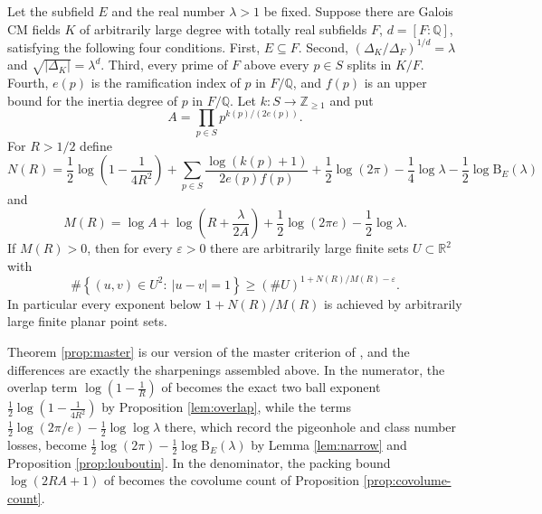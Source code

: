 \begin{theorem}\label{prop:master}
Let the subfield $E$ and the real number $\lambda>1$ be fixed.  Suppose there are Galois CM fields $K$ of arbitrarily large degree with totally real subfields $F$, $d=[F:\mathbb{Q}]$, satisfying the following four conditions.  First, $E\subseteq F$.  Second, $(\Delta_K/\Delta_F)^{1/d}=\lambda$ and $\sqrt{|\Delta_K|}=\lambda^d$.  Third, every prime of $F$ above every $p\in S$ splits in $K/F$.  Fourth, $e(p)$ is the ramification index of $p$ in $F/\mathbb{Q}$, and $f(p)$ is an upper bound for the inertia degree of $p$ in $F/\mathbb{Q}$.
Let $k:S\to\mathbb{Z}_{\geq1}$ and put
\[
   A=\prod_{p\in S}p^{k(p)/(2e(p))}.
\]
For $R>1/2$ define
\begin{equation}\label{eq:N-master}
   N(R)=
   \frac12\log\left(1-\frac1{4R^2}\right)
   +\sum_{p\in S}\frac{\log(k(p)+1)}{2e(p)f(p)}
   +\frac12\log(2\pi)
   -\frac14\log\lambda
   -\frac12\log \mathrm{B}_E(\lambda)
\end{equation}
and
\begin{equation}\label{eq:M-master}
   M(R)=
   \log A+\log\left(R+\frac{\lambda}{2A}\right)
   +\frac12\log(2\pi e)-\frac12\log\lambda.
\end{equation}
If $M(R)>0$, then for every $\varepsilon>0$ there are arbitrarily large finite sets $U\subset\mathbb{R}^2$ with
\[
   \#\left\{(u,v)\in U^2 :\ |u-v|=1\right\}\geq (\#U)^{1+N(R)/M(R)-\varepsilon}.
\]
In particular every exponent below $1+N(R)/M(R)$ is achieved by arbitrarily large finite planar point sets.
\end{theorem}
Theorem \ref{prop:master} is our version of the master criterion of \cite[Proposition 10]{Sawin}, and the differences are exactly the sharpenings assembled above.  In the numerator, the overlap term $\log(1-\frac{1}{R})$ of \cite{Sawin} becomes the exact two ball exponent $\frac{1}{2}\log(1-\frac{1}{4R^{2}})$ by Proposition \ref{lem:overlap}, while the terms $\frac{1}{2}\log(2\pi/e)-\frac{1}{2}\log\log\lambda$ there, which record the pigeonhole and class number losses, become $\frac{1}{2}\log(2\pi)-\frac{1}{2}\log \mathrm{B}_E(\lambda)$ by Lemma \ref{lem:narrow} and Proposition \ref{prop:louboutin}.  In the denominator, the packing bound $\log(2RA+1)$ of \cite{Sawin} becomes the covolume count of Proposition \ref{prop:covolume-count}.

